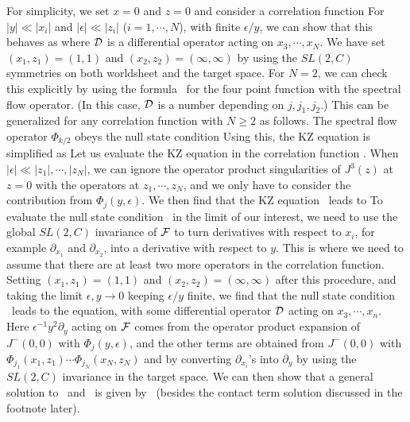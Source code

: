 For simplicity, we set $x=0$ and $z=0$ and
consider a correlation function
\eqn{}
For $|y| \ll |x_i|$ and $|\epsilon| \ll |z_i|$ ($i=1,\cdots, N$),
with finite $\epsilon/y$, we can show that this behaves as
\eqn{}
where ${\cal D}$ is a differential operator acting
on $x_3,\cdots, x_N$. We have set $(x_1,z_1)=(1,1)$
and $(x_2,z_2)=(\infty,\infty)$ by using the $SL(2,C)$
symmetries on both worldsheet and the target space.
For $N=2$, we can check this explicitly by using
the formula \solutiontwo\ for the four point function
with the spectral flow operator. (In this case,
${\cal D}$ is a number depending on $j, j_1, j_2$.)
This can be generalized
for any correlation function with $N \geq 2$ as follows.
The spectral flow operator $\Phi_{k/2}$ obeys the null state condition
\eqn{}
Using this, the KZ equation is simplified as
\eqn{}
Let us evaluate the KZ equation in the correlation function
 .
When $|\epsilon| \ll |z_1|, \cdots , |z_N|$, we can ignore
the operator product singularities of $J^3(z)$ at $z=0$
with the operators at $z_1,\cdots,z_N$, and we only have to
consider the contribution from $\Phi_j(y,\epsilon)$.
We then find that the KZ equation \kzagain\ leads to
\eqn{}
To evaluate the null state condition \nullagain\ in the limit of
our interest, we need to use the global $SL(2,C)$
invariance of ${\cal F}$ to turn derivatives
with respect to $x_i$, for example $\partial_{x_1}$
and $\partial_{x_2}$, into a derivative with
respect to $y$. This is where we need to assume that
there are at least two more operators in the correlation
function. Setting $(x_1,z_1)=(1,1)$ and $(x_2, z_2)=(\infty, \infty)$
after this procedure, and taking the limit $\epsilon, y
\rightarrow 0$ keeping $\epsilon/y$ finite, we find
that the null state condition \nullagain\ leads to the equation,
\eqn{}
with some differential operator ${\cal D}$ acting
on $x_3,\cdots, x_n$. Here
$\epsilon^{-1} y^2  \partial_y$ acting on ${\cal F}$
comes from the operator product expansion of $J^{-}(0,0)$
with $\Phi_j(y,\epsilon)$, and the other terms
are obtained from $J^-(0,0)$ with
$\Phi_{j_1}(x_1,z_1) \cdots \Phi_{j_N}(x_N,z_N)$
and by converting $\partial_{x_i}$'s into
$\partial_y$ by using the $SL(2,C)$ invariance
in the target space.
We can then show
that a general solution to \simplifiedkz\ and
\simplifiednull\ is given by \smallyepsilon\ (besides the
contact term solution discussed in the footnote later).

